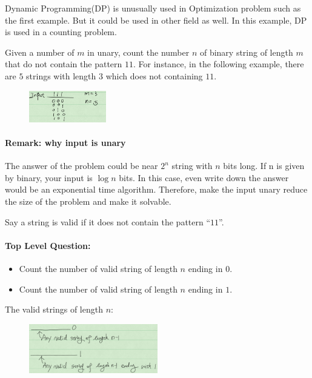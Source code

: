 Dynamic Programming(DP) is unusually used in Optimization problem such as the first example. But it could be used in other field as well. In this example, DP is used in a counting problem.

Given a number of $m$ in unary, count the number $n$ of binary string of length $m$ that do not contain the pattern $11$. For instance, in the following example, there are $5$ strings with length $3$ which does not containing $11$. 

\begin{figure}[H]
	\centering
	\includegraphics[width=0.3\textwidth]{fig/bin-pattern.png}
\end{figure}

\paragraph{Remark: why input is unary}The answer of the problem could be near $2^n$ string with $n$ bits long. If n is given by binary, your input is $\log n $ bits. In this case, even write down the answer would be an exponential time algorithm. Therefore, make the input unary reduce the size of the problem and make it solvable.

Say a string is valid if it does not contain the pattern ``$11$''.
\paragraph{Top Level Question:} 
\begin{itemize}
	\item Count the number of valid string of length $n$ ending in $0$.
	\item Count the number of valid string of length $n$ ending in $1$.
\end{itemize}

The valid strings of length $n$:
\begin{figure}[H]
	\centering
	\includegraphics[width=0.5\textwidth]{fig/valid-str.png}
\end{figure}

